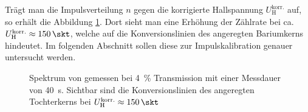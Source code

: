 \documentclass[11pt, a4paper]{article}
\numberwithin{equation}{section}
\begin{document}
Trägt man die Impulsverteilung $n$ gegen die korrigierte Hallspannung $U_\mathrm{H}^\mathrm{korr.}$ auf, so erhält die Abbildung \ref{fig:ba_t4_grob}.
Dort sieht man eine Erhöhung der Zählrate bei ca. $U_\mathrm{H}^\mathrm{korr.} \approx \SI{150}{\skt}$, welche auf die Konversionslinien des angeregten Bariumkerns hindeutet.
Im folgenden Abschnitt sollen diese zur Impulskalibration genauer untersucht werden.
\begin{figure}[h]
	\centering
	
	\caption{Spektrum von  gemessen bei \SI{4}{\percent} Transmission mit einer Messdauer von \SI{40}{\second}. Sichtbar sind die Konversionslinien des angeregten  Tochterkerns bei $U_\mathrm{H}^\mathrm{korr.} \approx \SI{150}{\skt}$}
	\label{fig:ba_t4_grob}
\end{figure}
\end{document}
